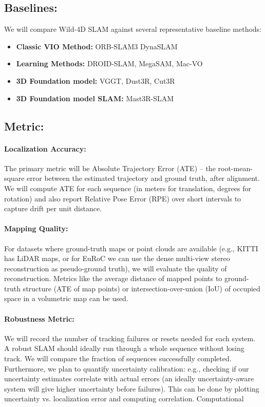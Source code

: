 \subsection{Baselines:} We will compare Wild-4D SLAM against several representative baseline methods:

\begin{itemize}
    \item \textbf{Classic VIO Method: } ORB-SLAM3 DynaSLAM 
    \item \textbf{Learning Methods:} DROID-SLAM, MegaSAM, Mac-VO
    \item \textbf{3D Foundation model: }VGGT, Dust3R, Cut3R
    \item  \textbf{3D Foundation model SLAM:} Mast3R-SLAM
\end{itemize}


\subsection{Metric:}
\paragraph{Localization Accuracy:} The primary metric will be Absolute Trajectory Error (ATE) – the root-mean-square error between the estimated trajectory and ground truth, after alignment. We will compute ATE for each sequence (in meters for translation, degrees for rotation) and also report Relative Pose Error (RPE) over short intervals to capture drift per unit distance.

\paragraph{Mapping Quality:} For datasets where ground-truth maps or point clouds are available (e.g., KITTI has LiDAR maps, or for EuRoC we can use the dense multi-view stereo reconstruction as pseudo-ground truth), we will evaluate the quality of reconstruction. Metrics like the average distance of mapped points to ground-truth structure (ATE of map points) or intersection-over-union (IoU) of occupied space in a volumetric map can be used. 
 
\paragraph{Robustness Metric\cite{zhao2024subt}:} We will record the number of tracking failures or resets needed for each system. A robust SLAM should ideally run through a whole sequence without losing track. We will compare the fraction of sequences successfully completed. Furthermore, we plan to quantify uncertainty calibration: e.g., checking if our uncertainty estimates correlate with actual errors (an ideally uncertainty-aware system will give higher uncertainty before failures). This can be done by plotting uncertainty vs. localization error and computing correlation.
Computational 

